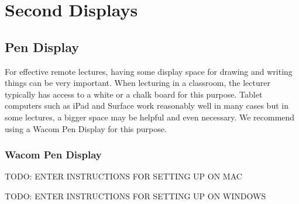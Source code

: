 \chapter{Second Displays}
\label{ch:displays}

\section{Pen Display}

For effective remote lectures, having some display space for drawing and writing things can be very important.  When lecturing in a classroom, the lecturer typically has access to a white or a chalk  board for this purpose.  
%
Tablet computers such as iPad and Surface work reasonably well in many cases but in some lectures, a bigger space may be helpful and even necessary. 
%
We recommend using a Wacom Pen Display for this purpose.

\subsection{Wacom Pen Display}



\begin{gram}
TODO: ENTER INSTRUCTIONS FOR SETTING UP ON MAC
\end{gram}


\begin{gram}
TODO: ENTER INSTRUCTIONS FOR SETTING UP ON WINDOWS
\end{gram}


